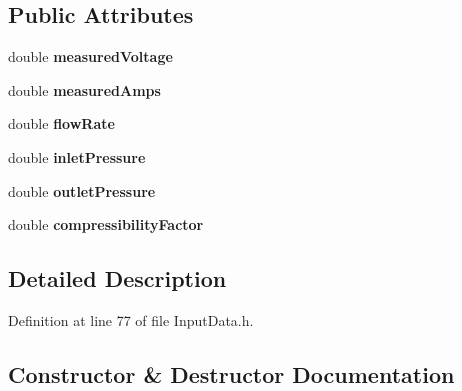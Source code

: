 \subsection*{Public Attributes}
\begin{DoxyCompactItemize}
\item 
\mbox{\label{struct_fan_1_1_field_data_modified_a453a1b579cabebf6d9290f17fbc99ea9}} 
double {\bfseries measured\+Voltage}
\item 
\mbox{\label{struct_fan_1_1_field_data_modified_a847588f365f094940b7877ed64f52d89}} 
double {\bfseries measured\+Amps}
\item 
\mbox{\label{struct_fan_1_1_field_data_modified_a15a9f9d55ca86b6ae2e35b9aa8ad4ff2}} 
double {\bfseries flow\+Rate}
\item 
\mbox{\label{struct_fan_1_1_field_data_modified_a695deafadc8221b19bbdfcdea142c73e}} 
double {\bfseries inlet\+Pressure}
\item 
\mbox{\label{struct_fan_1_1_field_data_modified_af07f26dff548735202cb53cbb98afc51}} 
double {\bfseries outlet\+Pressure}
\item 
\mbox{\label{struct_fan_1_1_field_data_modified_aebcb81efa08a8472052ae07ec9c816b0}} 
double {\bfseries compressibility\+Factor}
\end{DoxyCompactItemize}


\subsection{Detailed Description}


Definition at line 77 of file Input\+Data.\+h.



\subsection{Constructor \& Destructor Documentation}
\mbox{\label{struct_fan_1_1_field_data_modified_adef6a41f34fefd1acf3253d30fb4048d}} 
